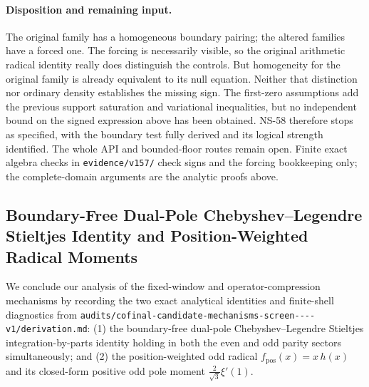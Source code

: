 \documentclass[11pt]{article}
\theoremstyle{remark}
\begin{document}
\paragraph{Disposition and remaining input.}
The original family has a homogeneous boundary pairing; the altered
families have a forced one. The forcing is necessarily visible, so
the original arithmetic radical identity really does distinguish the
controls. But homogeneity for the original family is already equivalent
to its null equation. Neither that distinction nor ordinary density
establishes the missing sign. The first-zero assumptions add the
previous support saturation and variational inequalities, but no
independent bound on the signed expression above has been obtained.
NS-58 therefore stops as specified, with the boundary test fully
derived and its logical strength identified. The whole API and
bounded-floor routes remain open. Finite exact algebra checks in
\texttt{evidence/v157/} check signs and the forcing bookkeeping only;
the complete-domain arguments are the analytic proofs above.




\subsection{Boundary-Free Dual-Pole Chebyshev--Legendre Stieltjes Identity and Position-Weighted Radical Moments}\label{subsec:dual-pole-bessel}

We conclude our analysis of the fixed-window and operator-compression mechanisms by recording the two exact analytical identities and finite-shell diagnostics from \texttt{audits/cofinal-\allowbreak candidate-\allowbreak mechanisms-\allowbreak screen----\allowbreak v1/\allowbreak derivation.md}: (1) the boundary-free dual-pole Chebyshev--Legendre Stieltjes integration-by-parts identity holding in both the even and odd parity sectors simultaneously; and (2) the position-weighted odd radical $f_{\mathrm{pos}}(x)=x\,h(x)$ and its closed-form positive odd pole moment $\frac{2}{\sqrt{3}}\xi'(1)$.
\end{document}
